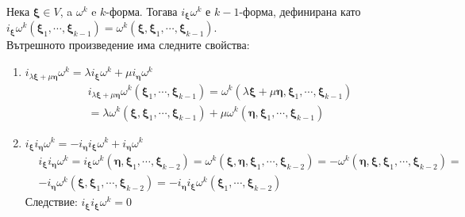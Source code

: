 \documentclass[12pt]{article}
\newcommand\myxi[0]{\boldsymbol{\xi}}
\newcommand\myeta[0]{\boldsymbol{\eta}}
\begin{document}
\begin{large}
Нека $\myxi \in V$, a $\omega^k$ e $k$-форма. Тогава $i_{\myxi}\omega^k$ е $k-1$-форма, дефинирана като $i_{\myxi}\omega^k(\myxi_1,\cdots,\myxi_{k-1})=\omega^k(\myxi,\myxi_1,\cdots,\myxi_{k-1})$. \\
Вътрешното произведение има следните свойства:
\begin{enumerate}
\item $i_{\lambda\myxi+\mu\myeta}\omega^k=\lambda i_{\myxi}\omega^k + \mu i_{\myeta}\omega^k$ \\
\begin{align*}
&i_{\lambda\myxi+\mu\myeta}\omega^k(\myxi_1,\cdots,\myxi_{k-1})=\omega^k(\lambda\myxi+\mu\myeta,\myxi_1,\cdots,\myxi_{k-1}) \\
&=\lambda\omega^k(\myxi,\myxi_1,\cdots,\myxi_{k-1})+\mu\omega^k(\myeta,\myxi_1,\cdots,\myxi_{k-1})
\end{align*}
\item $i_{\myxi}i_{\myeta}\omega^k=-i_{\myeta}i_{\myxi}\omega^k+i_{\myeta}\omega^k$
\begin{align*}
&i_{\myxi}i_{\myeta}\omega^k=i_{\myxi}\omega^k(\myeta,\myxi_1,\cdots,\myxi_{k-2}) 
=\omega^k(\myxi,\myeta,\myxi_1,\cdots,\myxi_{k-2})=-\omega^k(\myeta,\myxi,\myxi_1,\cdots,\myxi_{k-2})=\\
&-i_{\myeta}\omega^k(\myxi,\myxi_1,\cdots,\myxi_{k-2})=-i_{\myeta}i_{\myxi}\omega^k(\myxi_1,\cdots,\myxi_{k-2})
\end{align*}
Следствие: $i_{\myxi}i_{\myxi}\omega^k=0$


\end{enumerate}
\end{large}
\end{document}
